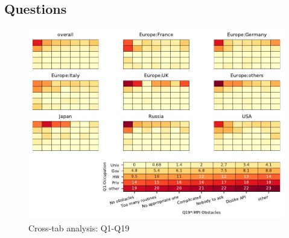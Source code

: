 
\subsection{Questions}


\begin{figure}
\begin{center}
\includegraphics[width=12cm]{../pdfs/Q1-Q19.pdf}
\caption{Cross-tab analysis: Q1-Q19}
\label{fig:Q1-Q19}
\end{center}
\end{figure}
